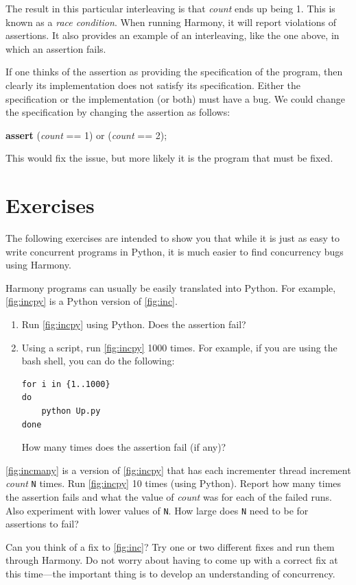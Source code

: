 \documentclass{report}
\newenvironment{code}{
\tcolorbox
}{
\endtcolorbox
}
\begin{document}
The result in this particular interleaving is that \textit{count} ends up
being 1.
This is known as a \emph{race condition}.
%
When running Harmony, it will
report violations of assertions.  It also provides an example
of an interleaving, like the one above, in which an assertion fails.

%

If one thinks of the assertion as providing the specification of the
program, then clearly its implementation does not satisfy its specification.
Either the specification or the implementation (or both) must have a bug.
We could change the specification by changing the assertion as follows:

\begin{code}
\textbf{assert} (\textit{count} == 1) or (\textit{count} == 2);
\end{code}

This would fix the issue, but more likely it is the program that must
be fixed.

\section*{Exercises}

The following exercises are intended to show you that while it is just
as easy to write concurrent programs in Python, it is much easier to
find concurrency bugs using Harmony.

\begin{problems}
\item Harmony programs can usually be easily translated into Python.  For example,
\autoref{fig:incpy} is a Python version of \autoref{fig:inc}.
\begin{enumerate}
\item Run \autoref{fig:incpy} using Python.  Does the assertion fail?
\item Using a script, run \autoref{fig:incpy} 1000 times.
For example, if you are using the bash shell, you can do the following:
\begin{code}
\begin{verbatim}
for i in {1..1000}
do
    python Up.py
done
\end{verbatim}
\end{code}
How many times does the assertion fail (if any)?
\end{enumerate}
\item \autoref{fig:incmany} is a version of \autoref{fig:incpy} that has each
incrementer thread increment \textit{count} \texttt{N} times.  Run \autoref{fig:incpy}
10 times (using Python).
Report how many times the assertion fails and what the value of \textit{count}
was for each of the failed runs.
Also experiment with lower values of \texttt{N}.
How large does \texttt{N} need to be for assertions to fail?
\item Can you think of a fix to \autoref{fig:inc}?  Try one or two different fixes
and run them through Harmony.  Do not worry about having to come up with a correct fix at this
time---the important thing is to develop an understanding of concurrency.
\end{problems}
\end{document}

